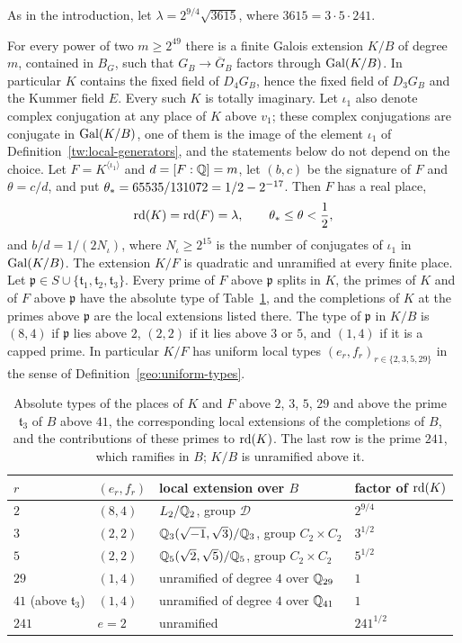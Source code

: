 As in the introduction, let $\lambda=2^{9/4}\sqrt{3615}$, where
$3615=3\cdot5\cdot241$.

\begin{theorem}\label{tw:field-family}
For every power of two $m\ge2^{49}$ there is a finite Galois extension
$K/B$ of degree $m$, contained in $B_G$, such that $G_B\to\overline G_B$
factors through $\operatorname{Gal}(K/B)$. In particular $K$ contains the fixed field of
$D_4G_B$, hence the fixed field of $D_3G_B$ and the Kummer field $E$. Every
such $K$ is totally imaginary. Let $\iota_1$ also denote complex
conjugation at any place of $K$ above $v_1$; these complex conjugations are
conjugate in $\operatorname{Gal}(K/B)$, one of them is the image of the element $\iota_1$
of Definition~\ref{tw:local-generators}, and the statements below do not
depend on the choice. Let $F=K^{\langle\iota_1\rangle}$ and
$d=[F:\mathbb Q]=m$, let $(b,c)$ be the signature of $F$ and $\theta=c/d$, and put
$\theta_*=65535/131072=1/2-2^{-17}$. Then $F$ has a real place,
\[
 \operatorname{rd}(K)=\operatorname{rd}(F)=\lambda,\qquad \theta_*\le\theta<\frac12 ,
\]
and $b/d=1/(2N_\iota)$, where $N_\iota\ge2^{15}$ is the number of conjugates
of $\iota_1$ in $\operatorname{Gal}(K/B)$. The extension $K/F$ is quadratic and unramified
at every finite place. Let $\mathfrak p\in S\cup\{\mathfrak t_1,\mathfrak
t_2,\mathfrak t_3\}$. Every prime of $F$ above $\mathfrak p$ splits in $K$, the
primes of $K$ and of $F$ above $\mathfrak p$ have the absolute type of
Table~\ref{tw:types-table}, and the completions of $K$ at the primes above
$\mathfrak p$ are the local extensions listed there. The type of $\mathfrak p$
in $K/B$ is $(8,4)$ if $\mathfrak p$ lies above $2$, $(2,2)$ if it lies above
$3$ or $5$, and $(1,4)$ if it is a capped prime. In particular $K/F$ has
uniform local types $(e_r,f_r)_{r\in\{2,3,5,29\}}$ in the sense of
Definition~\ref{geo:uniform-types}.
\end{theorem}

\begin{table}[htbp]
\centering
\caption{Absolute types of the places of $K$ and $F$ above $2$, $3$, $5$,
$29$ and above the prime $\mathfrak t_3$ of $B$ above $41$, the corresponding
local extensions of the completions of $B$, and the contributions of these
primes to $\operatorname{rd}(K)$. The last row is the prime $241$, which ramifies in $B$;
$K/B$ is unramified above it.}
\label{tw:types-table}
\begin{tabular}{llll}
\toprule
$r$ & $(e_r,f_r)$ & local extension over $B$ & factor of $\operatorname{rd}(K)$\\
\midrule
$2$ & $(8,4)$ & $L_2/\mathbb Q_2$, group $\mathcal D$ & $2^{9/4}$\\
$3$ & $(2,2)$ & $\mathbb Q_3(\sqrt{-1},\sqrt3)/\mathbb Q_3$, group $C_2\times C_2$ & $3^{1/2}$\\
$5$ & $(2,2)$ & $\mathbb Q_5(\sqrt2,\sqrt5)/\mathbb Q_5$, group $C_2\times C_2$ & $5^{1/2}$\\
$29$ & $(1,4)$ & unramified of degree $4$ over $\mathbb Q_{29}$ & $1$\\
$41$ (above $\mathfrak t_3$) & $(1,4)$ & unramified of degree $4$ over $\mathbb Q_{41}$ & $1$\\
\midrule
$241$ & $e=2$ & unramified & $241^{1/2}$\\
\bottomrule
\end{tabular}
\end{table}

